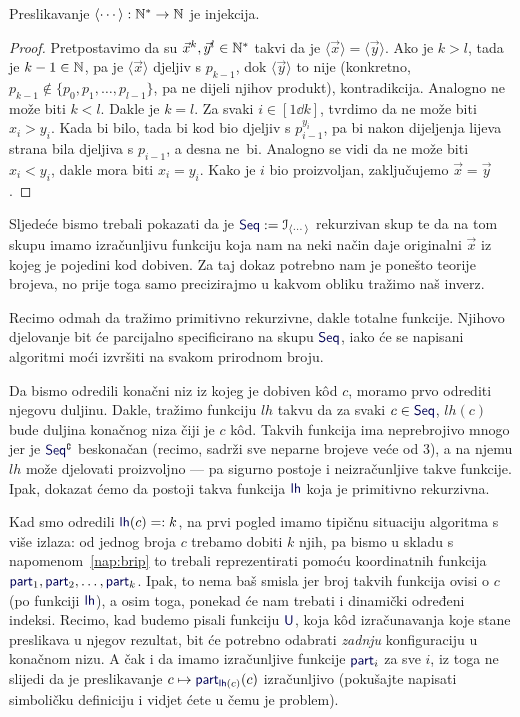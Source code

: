 \begin{propozicija}[{name=[injektivnost kodiranja konačnih nizova]}]\label{prop:codeinj}
Preslikavanje $\langle\cdots\rangle:{\mathbb N}^*\to{\mathbb N}$ je injekcija.
\end{propozicija}
\begin{proof}
    Pretpostavimo da su $\vec x^k,\vec y^{l}\in{\mathbb N}^*$ takvi da je $\langle\vec x\rangle=\langle\vec y\rangle$. Ako je $k>l$, tada je $k-1\in{\mathbb N}$, pa je $\langle\vec x\rangle$ djeljiv s $p_{k-1}$, dok $\langle\vec y\rangle$ to nije (konkretno, $p_{k-1}\notin\{p_0,p_1,\dotsc,p_{l-1}\}$, pa ne dijeli njihov produkt), kontradikcija. Analogno ne može biti $k<l$. Dakle je $k=l$. Za svaki $i\in[1\dd k]$, tvrdimo da ne može biti $x_i>y_i$. Kada bi bilo, tada bi kod bio djeljiv s $p_{i-1}^{y_i}$, pa bi nakon dijeljenja lijeva strana bila djeljiva s $p_{i-1}$, a desna ne~bi. Analogno se vidi da ne može biti $x_i<y_i$, dakle mora biti $x_i=y_i$. Kako je $i$ bio proizvoljan, zaključujemo $\vec x=\vec y$.
\end{proof}

Sljedeće bismo trebali pokazati da je $\f{Seq}:=\im{\langle\cdots\rangle}$ rekurzivan skup te da na tom skupu imamo izračunljivu funkciju koja nam na neki način daje originalni $\vec x$ iz kojeg je pojedini kod dobiven. Za taj dokaz potrebno nam je ponešto teorije brojeva, no prije toga samo precizirajmo u kakvom obliku tražimo naš inverz.

Recimo odmah da tražimo primitivno rekurzivne, dakle totalne funkcije. Njihovo djelovanje bit će parcijalno specificirano na skupu $\f{Seq}$, iako će se napisani algoritmi moći izvršiti na svakom prirodnom broju.

Da bismo odredili konačni niz iz kojeg je dobiven k\^od $c$, moramo prvo odrediti njegovu duljinu. Dakle, tražimo funkciju $lh$ takvu da za svaki $c\in\f{Seq}$, $lh(c)$ bude duljina konačnog niza čiji je $c$ k\^od. Takvih funkcija ima neprebrojivo mnogo jer je $\f{Seq}\kompl$ beskonačan (recimo, sadrži sve neparne brojeve veće od $3$), a na njemu $lh$ može djelovati proizvoljno --- pa sigurno postoje i neizračunljive takve funkcije. Ipak, dokazat ćemo da postoji takva funkcija $\f{lh}$ koja je primitivno rekurzivna.

Kad smo odredili $\f{lh}(c)=:k$, na prvi pogled imamo tipičnu situaciju algoritma s više izlaza: od jednog broja $c$ trebamo dobiti $k$ njih, pa bismo u skladu s napomenom~\ref{nap:brip} to trebali reprezentirati pomoću koordinatnih funkcija $\f{part}_1,\f{part}_2,\dotsc,\f{part}_k$. Ipak, to nema baš smisla jer broj takvih funkcija ovisi o $c$ (po funkciji $\f{lh}$), a osim toga, ponekad će nam trebati i dinamički određeni indeksi. Recimo, kad budemo pisali funkciju $\f U$, koja k\^od izračunavanja koje stane preslikava u njegov rezultat, bit će potrebno odabrati \emph{zadnju} konfiguraciju u konačnom nizu. A čak i da imamo izračunljive funkcije $\f{part}_i$ za sve $i$, iz toga ne slijedi da je preslikavanje $c\mapsto\f{part}_{\f{lh}(c)}(c)$ izračunljivo (pokušajte napisati simboličku definiciju i vidjet ćete u čemu je problem).

